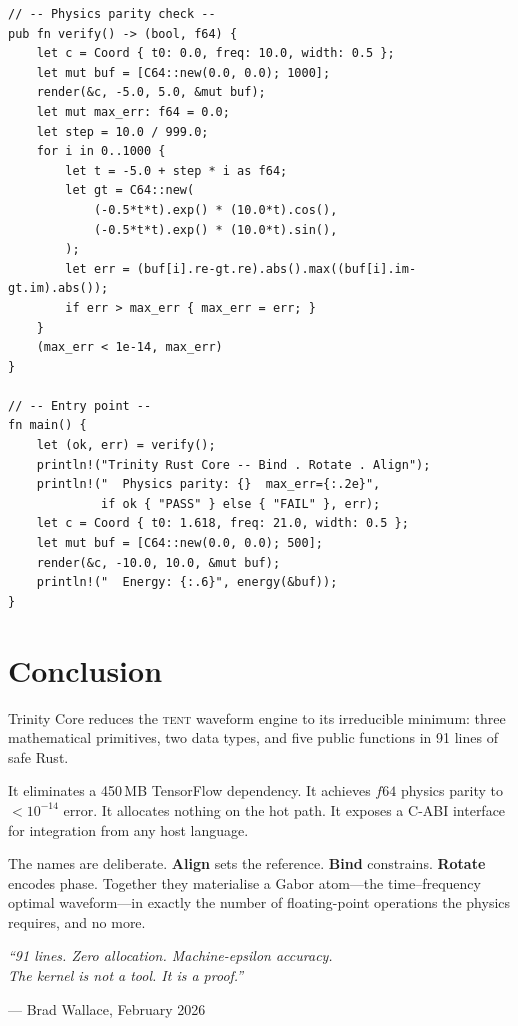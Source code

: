 \documentclass[11pt,a4paper]{article}
\theoremstyle{definition}
\newcommand{\TENT}{\textsc{tent}}
\begin{document}
\begin{lstlisting}[caption={Trinity Core --- complete 91-line Rust kernel (verbatim)},label={lst:full},basicstyle=\ttfamily\scriptsize]
// -- Physics parity check --
pub fn verify() -> (bool, f64) {
    let c = Coord { t0: 0.0, freq: 10.0, width: 0.5 };
    let mut buf = [C64::new(0.0, 0.0); 1000];
    render(&c, -5.0, 5.0, &mut buf);
    let mut max_err: f64 = 0.0;
    let step = 10.0 / 999.0;
    for i in 0..1000 {
        let t = -5.0 + step * i as f64;
        let gt = C64::new(
            (-0.5*t*t).exp() * (10.0*t).cos(),
            (-0.5*t*t).exp() * (10.0*t).sin(),
        );
        let err = (buf[i].re-gt.re).abs().max((buf[i].im-gt.im).abs());
        if err > max_err { max_err = err; }
    }
    (max_err < 1e-14, max_err)
}

// -- Entry point --
fn main() {
    let (ok, err) = verify();
    println!("Trinity Rust Core -- Bind . Rotate . Align");
    println!("  Physics parity: {}  max_err={:.2e}",
             if ok { "PASS" } else { "FAIL" }, err);
    let c = Coord { t0: 1.618, freq: 21.0, width: 0.5 };
    let mut buf = [C64::new(0.0, 0.0); 500];
    render(&c, -10.0, 10.0, &mut buf);
    println!("  Energy: {:.6}", energy(&buf));
}
\end{lstlisting}

\section{Conclusion}

Trinity Core reduces the \TENT{} waveform engine to its irreducible
minimum: three mathematical primitives, two data types, and five
public functions in 91 lines of safe Rust.

It eliminates a 450\,MB TensorFlow dependency.
It achieves $f64$ physics parity to $< 10^{-14}$ error.
It allocates nothing on the hot path.
It exposes a C-ABI interface for integration from any host language.

The names are deliberate.
\textbf{Align} sets the reference.
\textbf{Bind} constrains.
\textbf{Rotate} encodes phase.
Together they materialise a Gabor atom---the time--frequency optimal
waveform---in exactly the number of floating-point operations the
physics requires, and no more.

\bigskip
\begin{center}
\large\itshape
``91 lines. Zero allocation. Machine-epsilon accuracy.\\
The kernel is not a tool. It is a proof.''
\end{center}
\begin{center}
\normalsize --- Brad Wallace, February 2026
\end{center}
\end{document}
